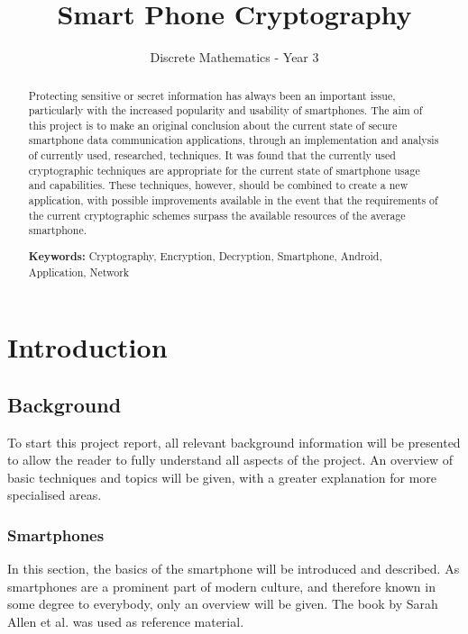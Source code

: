 \documentclass[a4paper,12pt]{report}
\title{\Huge Smart Phone Cryptography}
\author{Discrete Mathematics - Year 3}
\begin{document}
\maketitle

\begin{abstract}

Protecting sensitive or secret information has always been an important issue, particularly with the increased popularity and usability of smartphones. The aim of this project is to make an original conclusion about the current state of secure smartphone data communication applications, through an implementation and analysis of currently used, researched, techniques. It was found that the currently used cryptographic techniques are appropriate for the current state of smartphone usage and capabilities. These techniques, however, should be combined to create a new application, with possible improvements available in the event that the requirements of the current cryptographic schemes surpass the available resources of the average smartphone.

{\bf Keywords:} Cryptography, Encryption, Decryption, Smartphone, Android, Application, Network
\end{abstract}

\tableofcontents


\chapter{Introduction}


\section{Background}

To start this project report, all relevant background information will be presented to allow the reader to fully understand all aspects of the project. An overview of basic techniques and topics will be given, with a greater explanation for more specialised areas. 

\subsection{Smartphones}

In this section, the basics of the smartphone will be introduced and described. As smartphones are a prominent part of modern culture, and therefore known in some degree to everybody, only an overview will be given. The book by Sarah Allen et al. \cite{whatisasmartphone} was used as reference material.
\end{document}
